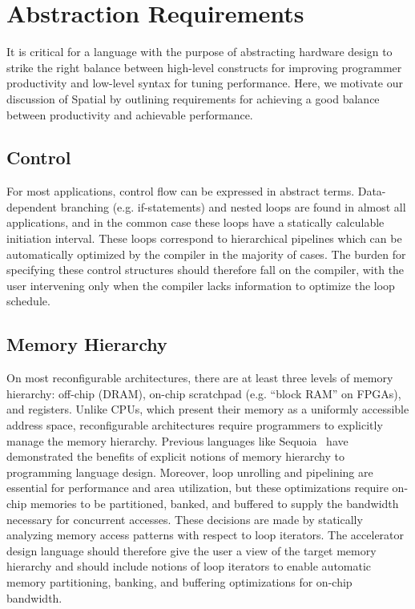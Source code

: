 \section{Abstraction Requirements}
\label{requirements}
It is critical for a language with the purpose of abstracting hardware design to strike the right
balance between high-level constructs for improving programmer productivity and low-level syntax for tuning performance. Here, we motivate our discussion of Spatial by outlining requirements for achieving a good balance between productivity and achievable performance.

\subsection{Control}
For most applications, control flow can be expressed in abstract terms. Data-dependent branching (e.g. if-statements)
and nested loops are found in almost all applications, and in the common case these loops have a statically calculable
initiation interval. These loops correspond to hierarchical pipelines which can be automatically optimized by the
compiler in the majority of cases. The burden for specifying these control structures should therefore fall on the
compiler, with the user intervening only when the compiler lacks information to optimize the loop schedule.

\subsection{Memory Hierarchy}
On most reconfigurable architectures, there are at least three levels of memory hierarchy: off-chip (DRAM),
on-chip scratchpad (e.g. ``block RAM'' on FPGAs), and registers.
Unlike CPUs, which present their memory as a uniformly accessible address space,
reconfigurable architectures require programmers to explicitly manage the memory hierarchy.
Previous languages like Sequoia~\cite{sequoia} have demonstrated the benefits of explicit notions of memory hierarchy
to programming language design. Moreover, loop unrolling and pipelining are essential for performance and area utilization, but these optimizations
require on-chip memories to be partitioned, banked, and buffered to supply the bandwidth necessary for concurrent accesses.
These decisions are made by statically analyzing memory access patterns with respect to loop iterators.
The accelerator design language should therefore give the user a view of the target memory
hierarchy and should include notions of loop iterators to enable automatic memory partitioning, banking, and buffering optimizations for on-chip bandwidth.

